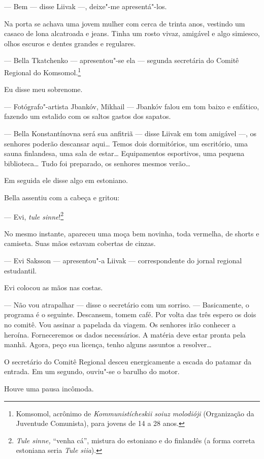 --- Bem --- disse Liivak ---, deixe"-me
apresentá"-los.

Na porta se achava uma jovem mulher com cerca de trinta anos, vestindo
um casaco de lona alcatroada e jeans. Tinha um rosto vivaz, amigável e
algo simiesco, olhos escuros e dentes grandes e regulares.

--- Bella Tkatchenko --- apresentou"-se ela ---
segunda secretária do Comitê Regional do Komsomol.\footnote{Komsomol,
  acrônimo de \emph{Kommunistícheskii soiuz molodióji} (Organização da
  Juventude Comunista), para jovens de 14 a 28 anos.}

Eu disse meu sobrenome.

--- Fotógrafo"-artista Jbankóv, Mikhail --- Jbankóv falou
em tom baixo e enfático, fazendo um estalido com os saltos gastos dos
sapatos.

--- Bella Konstantínovna será sua anfitriã --- disse
Liivak em tom amigável ---, os senhores poderão descansar aqui\ldots{}
Temos dois dormitórios, um escritório, uma sauna finlandesa, uma sala de
estar\ldots{} Equipamentos esportivos, uma pequena biblioteca\ldots{} Tudo foi
preparado, os senhores mesmos verão\ldots{}

Em seguida ele disse algo em estoniano.

Bella assentiu com a cabeça e gritou:

--- Evi, \emph{tule sinne}!\footnote{\emph{Tule sinne,} ``venha
  cá'', mistura do estoniano e do finlandês (a forma correta estoniana
  seria \emph{Tule siia}).}

No mesmo instante, apareceu uma moça bem novinha, toda vermelha, de
shorts e camiseta. Suas mãos estavam cobertas de cinzas.

--- Evi Saksson --- apresentou"-a Liivak ---
correspondente do jornal regional estudantil.

Evi colocou as mãos nas costas.

--- Não vou atrapalhar --- disse o secretário com um
sorriso. --- Basicamente, o programa é o seguinte. Descansem,
tomem café. Por volta das três espero os dois no comitê. Vou assinar a
papelada da viagem. Os senhores irão conhecer a heroína. Forneceremos os
dados necessários. A matéria deve estar pronta pela manhã. Agora, peço
sua licença, tenho alguns assuntos a resolver\ldots{}

O secretário do Comitê Regional desceu energicamente a escada do patamar
da entrada. Em um segundo, ouviu"-se o barulho do motor.

Houve uma pausa incômoda.

